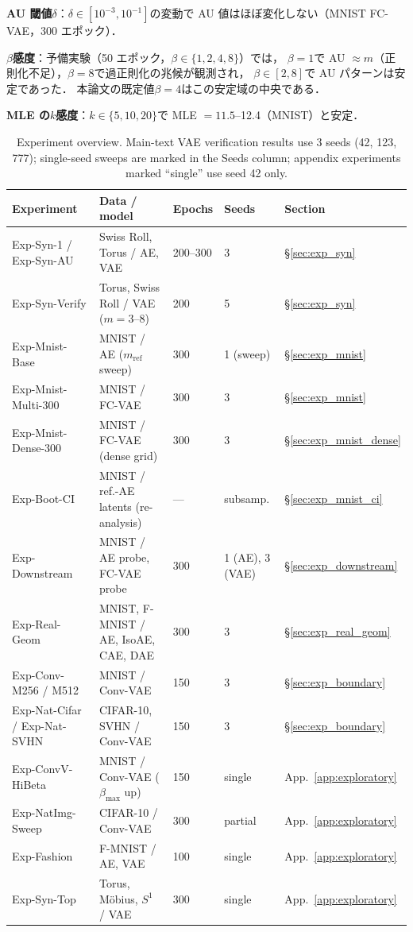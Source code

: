 \documentclass[11pt,a4paper]{jsarticle}
\begin{document}
\textbf{AU 閾値$\delta$}：$\delta \in [10^{-3}, 10^{-1}]$の変動で
AU 値はほぼ変化しない（MNIST FC-VAE，300 エポック）．

\textbf{$\beta$感度}：予備実験（50 エポック，$\beta \in \{1, 2, 4, 8\}$）では，
$\beta = 1$で AU $\approx m$（正則化不足），$\beta = 8$で過正則化の兆候が観測され，
$\beta \in [2, 8]$で AU パターンは安定であった．
本論文の既定値$\beta = 4$はこの安定域の中央である．

\textbf{MLE の$k$感度}：$k \in \{5, 10, 20\}$で MLE $= 11.5$--12.4（MNIST）と安定．

\begin{table}[H]
\centering
\caption{Experiment overview. Main-text VAE verification results use 3 seeds
(42, 123, 777); single-seed sweeps are marked in the Seeds column; appendix
experiments marked ``single'' use seed 42 only.}
\label{tab:exp_list}
\small
\begin{tabular}{p{3.4cm}p{3.4cm}p{2.2cm}p{1.6cm}p{2.2cm}}
\toprule
Experiment & Data / model & Epochs & Seeds & Section \\
\midrule
Exp-Syn-1 / Exp-Syn-AU & Swiss Roll, Torus / AE, VAE & 200--300 & 3 & §\ref{sec:exp_syn} \\
Exp-Syn-Verify & Torus, Swiss Roll / VAE ($m = 3$--$8$) & 200 & 5 & §\ref{sec:exp_syn} \\
Exp-Mnist-Base & MNIST / AE ($m_{\mathrm{ref}}$ sweep) & 300 & 1 (sweep) & §\ref{sec:exp_mnist} \\
Exp-Mnist-Multi-300 & MNIST / FC-VAE & 300 & 3 & §\ref{sec:exp_mnist} \\
Exp-Mnist-Dense-300 & MNIST / FC-VAE (dense grid) & 300 & 3 & §\ref{sec:exp_mnist_dense} \\
Exp-Boot-CI & MNIST / ref.-AE latents (re-analysis) & --- & subsamp. & §\ref{sec:exp_mnist_ci} \\
Exp-Downstream & MNIST / AE probe, FC-VAE probe & 300 & 1 (AE), 3 (VAE) & §\ref{sec:exp_downstream} \\
Exp-Real-Geom & MNIST, F-MNIST / AE, IsoAE, CAE, DAE & 300 & 3 & §\ref{sec:exp_real_geom} \\
Exp-Conv-M256 / M512 & MNIST / Conv-VAE & 150 & 3 & §\ref{sec:exp_boundary} \\
Exp-Nat-Cifar / Exp-Nat-SVHN & CIFAR-10, SVHN / Conv-VAE & 150 & 3 & §\ref{sec:exp_boundary} \\
Exp-ConvV-HiBeta & MNIST / Conv-VAE ($\beta_{\max}$ up) & 150 & single & App.~\ref{app:exploratory} \\
Exp-NatImg-Sweep & CIFAR-10 / Conv-VAE & 300 & partial & App.~\ref{app:exploratory} \\
Exp-Fashion & F-MNIST / AE, VAE & 100 & single & App.~\ref{app:exploratory} \\
Exp-Syn-Top & Torus, M\"obius, $S^1$ / VAE & 300 & single & App.~\ref{app:exploratory} \\
\bottomrule
\end{tabular}
\end{table}
\end{document}
